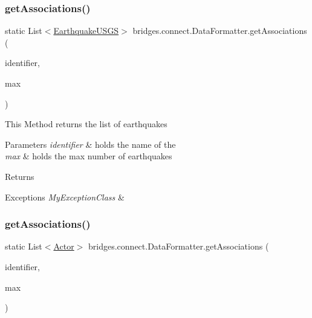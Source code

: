 \subsubsection{\texorpdfstring{get\+Associations()}{getAssociations()}\hspace{0.1cm}{\footnotesize\ttfamily [3/5]}}
{\footnotesize\ttfamily static List$<$\mbox{\hyperlink{classbridges_1_1data__src__dependent_1_1_earthquake_u_s_g_s}{Earthquake\+U\+S\+GS}}$>$ bridges.\+connect.\+Data\+Formatter.\+get\+Associations (\begin{DoxyParamCaption}\item[{\mbox{\hyperlink{classbridges_1_1data__src__dependent_1_1_u_s_g_saccount}{U\+S\+G\+Saccount}}}]{identifier,  }\item[{int}]{max }\end{DoxyParamCaption})\hspace{0.3cm}{\ttfamily [static]}}

This Method returns the list of earthquakes 
\begin{DoxyParams}{Parameters}
{\em identifier} & holds the name of the \\
\hline
{\em max} & holds the max number of earthquakes \\
\hline
\end{DoxyParams}
\begin{DoxyReturn}{Returns}

\end{DoxyReturn}

\begin{DoxyExceptions}{Exceptions}
{\em My\+Exception\+Class} & \\
\hline
\end{DoxyExceptions}
\mbox{\label{classbridges_1_1connect_1_1_data_formatter_a5e9f400a020b99e0bbba1fd5332a8f88}} 
\subsubsection{\texorpdfstring{get\+Associations()}{getAssociations()}\hspace{0.1cm}{\footnotesize\ttfamily [4/5]}}
{\footnotesize\ttfamily static List$<$\mbox{\hyperlink{classbridges_1_1data__src__dependent_1_1_actor}{Actor}}$>$ bridges.\+connect.\+Data\+Formatter.\+get\+Associations (\begin{DoxyParamCaption}\item[{\mbox{\hyperlink{classbridges_1_1data__src__dependent_1_1_actor}{Actor}}}]{identifier,  }\item[{int}]{max }\end{DoxyParamCaption})\hspace{0.3cm}{\ttfamily [static]}}

